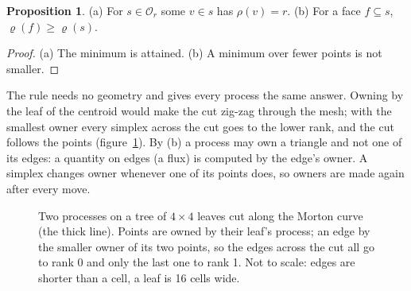 \documentclass[10pt,a4paper]{article}
\theoremstyle{definition}
\newtheorem{proposition}{Proposition}
\begin{document}
\begin{proposition}
  \label{prop:owner}
  (a) For $s \in \mathcal{O}_r$ some $v \in s$ has $\rho(v) = r$. (b) For a
  face $f \subseteq s$, $\varrho(f) \ge \varrho(s)$.
\end{proposition}
\begin{proof}
  (a) The minimum is attained. (b) A minimum over fewer points is not
  smaller.
\end{proof}

The rule needs no geometry and gives every process the same answer. Owning
by the leaf of the centroid would make the cut zig-zag through the mesh;
with the smallest owner every simplex across the cut goes to the lower
rank, and the cut follows the points (figure~\ref{fig:part}). By (b) a
process may own a triangle and not one of its edges: a quantity on edges
(a flux) is computed by the edge's owner. A simplex changes owner whenever
one of its points does, so owners are made again after every move.

\begin{figure}[H]
\centering
{}
\caption{Two processes on a tree of $4 \times 4$ leaves cut along the Morton
  curve (the thick line). Points are owned by their leaf's process; an
  edge by the smaller owner of its two points, so the edges across the cut
  all go to rank 0 and only the last one to rank 1. Not to scale: edges are
  shorter than a cell, a leaf is 16 cells wide.}
\label{fig:part}
\end{figure}
\end{document}
